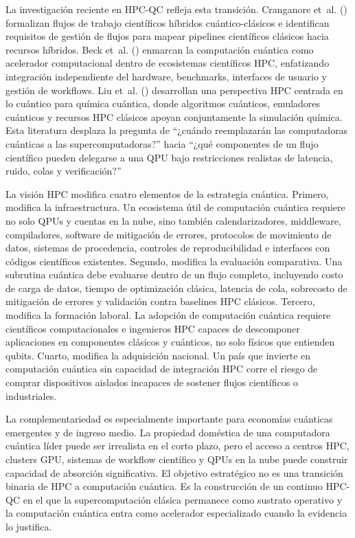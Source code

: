 \documentclass[
  11pt,
  letterpaper,
]{article}
\begin{document}
La investigación reciente en HPC-QC refleja esta transición. Cranganore
et~al. () formalizan flujos de
trabajo científicos híbridos cuántico-clásicos e identifican requisitos
de gestión de flujos para mapear pipelines científicos clásicos hacia
recursos híbridos. Beck et~al. () enmarcan
la computación cuántica como acelerador computacional dentro de
ecosistemas científicos HPC, enfatizando integración independiente del
hardware, benchmarks, interfaces de usuario y gestión de workflows. Liu
et~al. () desarrollan una perspectiva HPC
centrada en lo cuántico para química cuántica, donde algoritmos
cuánticos, emuladores cuánticos y recursos HPC clásicos apoyan
conjuntamente la simulación química. Esta literatura desplaza la
pregunta de ``¿cuándo reemplazarán las computadoras cuánticas a las
supercomputadoras?'' hacia ``¿qué componentes de un flujo científico
pueden delegarse a una QPU bajo restricciones realistas de latencia,
ruido, colas y verificación?''

La visión HPC modifica cuatro elementos de la estrategia cuántica.
Primero, modifica la infraestructura. Un ecosistema útil de computación
cuántica requiere no solo QPUs y cuentas en la nube, sino también
calendarizadores, middleware, compiladores, software de mitigación de
errores, protocolos de movimiento de datos, sistemas de procedencia,
controles de reproducibilidad e interfaces con códigos científicos
existentes. Segundo, modifica la evaluación comparativa. Una subrutina
cuántica debe evaluarse dentro de un flujo completo, incluyendo costo de
carga de datos, tiempo de optimización clásica, latencia de cola,
sobrecosto de mitigación de errores y validación contra baselines HPC
clásicos. Tercero, modifica la formación laboral. La adopción de
computación cuántica requiere científicos computacionales e ingenieros
HPC capaces de descomponer aplicaciones en componentes clásicos y
cuánticos, no solo físicos que entienden qubits. Cuarto, modifica la
adquisición nacional. Un país que invierte en computación cuántica sin
capacidad de integración HPC corre el riesgo de comprar dispositivos
aislados incapaces de sostener flujos científicos o industriales.

La complementariedad es especialmente importante para economías
cuánticas emergentes y de ingreso medio. La propiedad doméstica de una
computadora cuántica líder puede ser irrealista en el corto plazo, pero
el acceso a centros HPC, clusters GPU, sistemas de workflow científico y
QPUs en la nube puede construir capacidad de absorción significativa. El
objetivo estratégico no es una transición binaria de HPC a computación
cuántica. Es la construcción de un continuo HPC-QC en el que la
supercomputación clásica permanece como sustrato operativo y la
computación cuántica entra como acelerador especializado cuando la
evidencia lo justifica.
\end{document}
